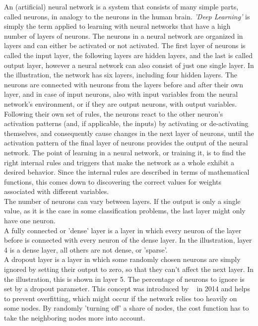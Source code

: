 \documentclass[
a4paper,
pagesize,
pdftex,
12pt,
twoside, %
BCOR=5mm, %
ngerman,
fleqn,
final,
]{scrartcl}
\begin{document}
	An (artificial) neural network is a system that consists of many simple parts, called neurons, in analogy to the neurons in the human brain. \textit{'Deep Learning'} is simply the term applied to learning with neural networks that have a high number of layers of neurons. The neurons in a neural network are organized in layers and can either be activated or not activated. The first layer of neurons is called the input layer, the following layers are hidden layers, and the last is called output layer, however a neural network can also consist of just one single layer. In the illustration, the network has six layers, including four hidden layers. The neurons are connected with neurons from the layers before and after their own layer, and in case of input neurons, also with input variables from the neural network's environment, or if they are output neurons, with output variables. Following their own set of rules, the neurons react to the other neuron's activation patterns (and, if applicable, the inputs) by activating or de-activating themselves, and consequently cause changes in the next layer of neurons, until the activation pattern of the final layer of neurons provides the output of the neural network. The point of learning in a neural network, or training it, is to find the right internal rules and triggers that make the network as a whole exhibit a desired behavior. Since the internal rules are described in terms of mathematical functions, this comes down to discovering the correct values for weights associated with different variables.\\
	The number of neurons can vary between layers. If the output is only a single value, as it is the case in some classification problems, the last layer might only have one neuron.\\
	A fully connected or 'dense' layer is a layer in which every neuron of the layer before is connected with every neuron of the dense layer. In the illustration, layer 4 is a dense layer, all others are not dense, or 'sparse'.\\
	A dropout layer is a layer in which some randomly chosen neurons are simply ignored by setting their output to zero, so that they can't affect the next layer. In the illustration, this is shown in layer 5. The percentage of neurons to ignore is set by a dropout parameter. This concept was introduced by ~\cite{Srivastava.2014} in 2014 and helps to prevent overfitting, which might occur if the network relies too heavily on some nodes. By randomly 'turning off' a share of nodes, the cost function has to take the neighboring nodes more into account.\\
\end{document}
